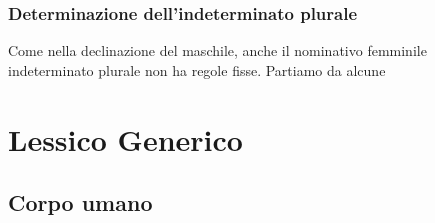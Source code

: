 \subsection{Determinazione dell'indeterminato plurale}

Come nella declinazione del maschile, anche il nominativo femminile indeterminato plurale non ha regole fisse. Partiamo da alcune 

\chapter{Lessico Generico}

\section{Corpo umano}

